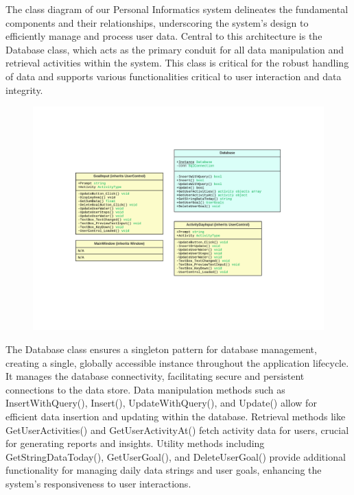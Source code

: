 \documentclass[12pt]{article}
\begin{document}
The class diagram of our Personal Informatics system delineates the fundamental components and their relationships, underscoring the system's design to efficiently manage and process user data. Central to this architecture is the Database class, which acts as the primary conduit for all data manipulation and retrieval activities within the system. This class is critical for the robust handling of data and supports various functionalities critical to user interaction and data integrity.\par

\begin{figure}[h]
\centering
\includegraphics{UML Class diagram}
\end{figure}

The Database class ensures a singleton pattern for database management, creating a single, globally accessible instance throughout the application lifecycle. It manages the database connectivity, facilitating secure and persistent connections to the data store. Data manipulation methods such as InsertWithQuery(), Insert(), UpdateWithQuery(), and Update() allow for efficient data insertion and updating within the database. Retrieval methods like GetUserActivities() and GetUserActivityAt() fetch activity data for users, crucial for generating reports and insights. Utility methods including GetStringDataToday(), GetUserGoal(), and DeleteUserGoal() provide additional functionality for managing daily data strings and user goals, enhancing the system’s responsiveness to user interactions.\par
\end{document}
